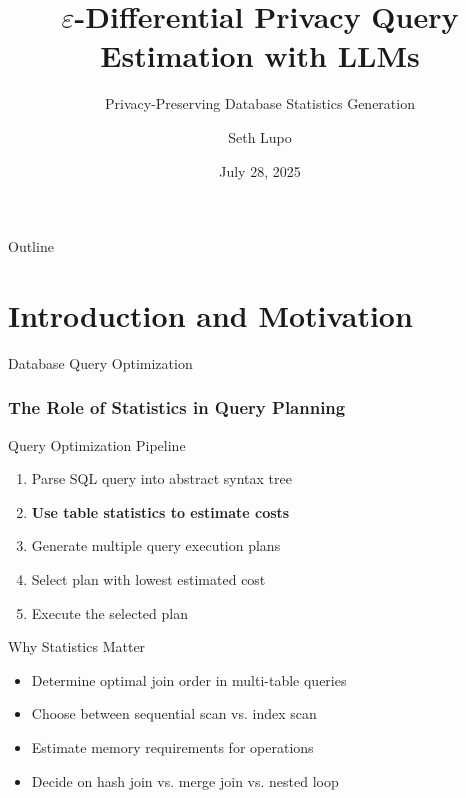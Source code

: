 \documentclass[smaller]{beamer}
\title{$\varepsilon$-Differential Privacy Query Estimation with LLMs}
\subtitle{Privacy-Preserving Database Statistics Generation}
\author{Seth Lupo}
\institute{Tufts Security and Privacy Lab\\
\texttt{seth.lupo@tufts.edu}}
\date{July 28, 2025}
\begin{document}
\begin{frame}
\titlepage
\end{frame}

\begin{frame}{Outline}
\tableofcontents
\end{frame}

\section{Introduction and Motivation}

\begin{frame}{Database Query Optimization}
\frametitle{The Role of Statistics in Query Planning}

\begin{block}{Query Optimization Pipeline}
\begin{enumerate}
    \item Parse SQL query into abstract syntax tree
    \item \textbf{Use table statistics to estimate costs}
    \item Generate multiple query execution plans
    \item Select plan with lowest estimated cost
    \item Execute the selected plan
\end{enumerate}
\end{block}

\vspace{0.5cm}

\begin{alertblock}{Why Statistics Matter}
\begin{itemize}
    \item Determine optimal join order in multi-table queries
    \item Choose between sequential scan vs. index scan
    \item Estimate memory requirements for operations
    \item Decide on hash join vs. merge join vs. nested loop
\end{itemize}
\end{alertblock}

\end{frame}
\end{document}
